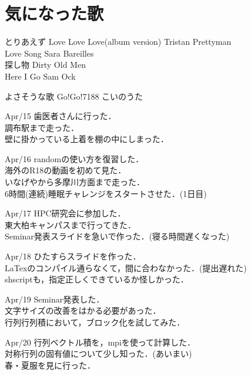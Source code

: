 \documentclass[11pt, a4paper]{jsarticle}
\begin{document}
\tableofcontents %
\newpage

\section{気になった歌}
\begin{itembox}[r]{とりあえず}
	Love Love Love(album version) Tristan Prettyman\\
	Love Song Sara Bareilles\\
	探し物 Dirty Old Men\\
	Here I Go Sam Ock\\
\end{itembox}

\begin{itembox}[r]{よさそうな歌}
	Go!Go!7188 こいのうた
\end{itembox}

\begin{itembox}[r]{Apr/15}
	歯医者さんに行った．\\
	調布駅まで走った．\\
	壁に掛かっている上着を棚の中にしまった．
\end{itembox}

\begin{itembox}[r]{Apr/16}
	randomの使い方を復習した．\\
	海外のR18の動画を初めて見た．\\
	いなげやから多摩川方面まで走った．\\
	6時間(連続)睡眠チャレンジをスタートさせた．(1日目)
\end{itembox}

\begin{itembox}[r]{Apr/17}
	HPC研究会に参加した．\\
	東大柏キャンパスまで行ってきた．\\
	Seminar発表スライドを急いで作った．(寝る時間遅くなった)
\end{itembox}

\begin{itembox}[r]{Apr/18}
	ひたすらスライドを作った．\\
	LaTexのコンパイル通らなくて，間に合わなかった．(提出遅れた)\\
	shscriptも，指定正しくできているか怪しかった．
\end{itembox}

\begin{itembox}[r]{Apr/19}
	Seminar発表した．\\
	文字サイズの改善をはかる必要があった．\\
	行列行列積において，ブロック化を試してみた．
\end{itembox}

\begin{itembox}[r]{Apr/20}
	行列ベクトル積を，mpiを使って計算した．\\
	対称行列の固有値について少し知った．(あいまい)\\
	春・夏服を見に行った．
\end{itembox}
\end{document}
